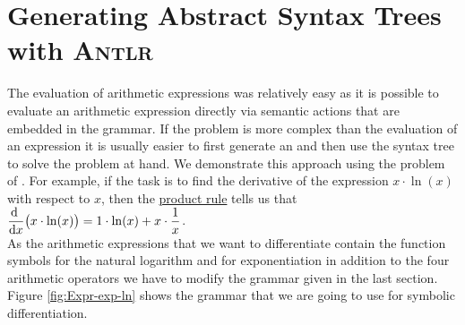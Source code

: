 \section{Generating Abstract Syntax Trees with \textsc{Antlr}}
The evaluation of arithmetic expressions was relatively easy as it is possible to evaluate an arithmetic expression
directly via semantic actions that are embedded in the grammar.  If the problem is more complex than the
evaluation of an expression it is usually easier to first generate an  and then use
the syntax tree to solve the problem at hand.  We demonstrate this approach using the problem of 
.  
For example, if the task is to find the derivative of the expression $x \cdot \ln(x)$
with respect to $x$, then the \href{https://en.wikipedia.org/wiki/Product_rule}{product rule} 
tells us that 
\\[0.2cm]
\hspace*{1.3cm}
$\displaystyle \frac{\mathrm{d} \;}{\mathrm{d} x} \bigl(x \cdot \ln(x)\bigr) = 1 \cdot \ln(x) + x \cdot \frac{1}{x}$.
\\[0.2cm]
As the arithmetic expressions that we want to differentiate contain the function symbols for the natural
logarithm and for exponentiation in addition to the four arithmetic operators we have to modify the grammar
given in the last section.
Figure \ref{fig:Expr-exp-ln} shows the grammar that we are going to use for symbolic differentiation.


